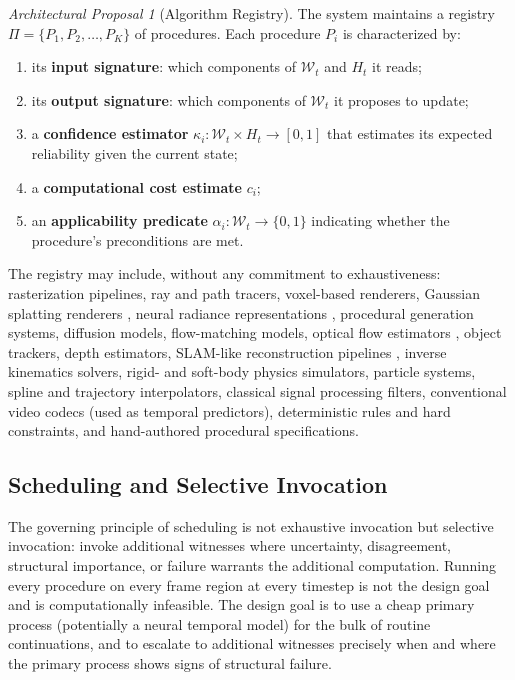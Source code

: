 \documentclass[11pt,a4paper]{article}
\theoremstyle{plain}
\theoremstyle{definition}
\theoremstyle{remark}
\newtheorem{proposal}[theorem]{Architectural Proposal}
\begin{document}
\begin{proposal}[Algorithm Registry]
\label{prop:registry}
The system maintains a registry $\Pi = \{P_1, P_2, \ldots, P_K\}$ of procedures. Each procedure $P_i$ is characterized by:
\begin{enumerate}[leftmargin=2em,itemsep=0pt]
\item its \textbf{input signature}: which components of $\mathcal{W}_t$ and $H_t$ it reads;
\item its \textbf{output signature}: which components of $\mathcal{W}_t$ it proposes to update;
\item a \textbf{confidence estimator} $\kappa_i : \mathcal{W}_t \times H_t \to [0,1]$ that estimates its expected reliability given the current state;
\item a \textbf{computational cost estimate} $c_i$;
\item an \textbf{applicability predicate} $\alpha_i : \mathcal{W}_t \to \{0,1\}$ indicating whether the procedure's preconditions are met.
\end{enumerate}
\end{proposal}

The registry may include, without any commitment to exhaustiveness: rasterization pipelines, ray and path tracers, voxel-based renderers, Gaussian splatting renderers \cite{kerbl2023gaussians}, neural radiance representations \cite{mildenhall2020nerf}, procedural generation systems, diffusion models, flow-matching models, optical flow estimators \cite{horn1981optical,lucas1981optical}, object trackers, depth estimators, SLAM-like reconstruction pipelines \cite{davison2007monoslam}, inverse kinematics solvers, rigid- and soft-body physics simulators, particle systems, spline and trajectory interpolators, classical signal processing filters, conventional video codecs (used as temporal predictors), deterministic rules and hard constraints, and hand-authored procedural specifications.

\subsection{Scheduling and Selective Invocation}

The governing principle of scheduling is not exhaustive invocation but selective invocation: invoke additional witnesses where uncertainty, disagreement, structural importance, or failure warrants the additional computation. Running every procedure on every frame region at every timestep is not the design goal and is computationally infeasible. The design goal is to use a cheap primary process (potentially a neural temporal model) for the bulk of routine continuations, and to escalate to additional witnesses precisely when and where the primary process shows signs of structural failure.
\end{document}
